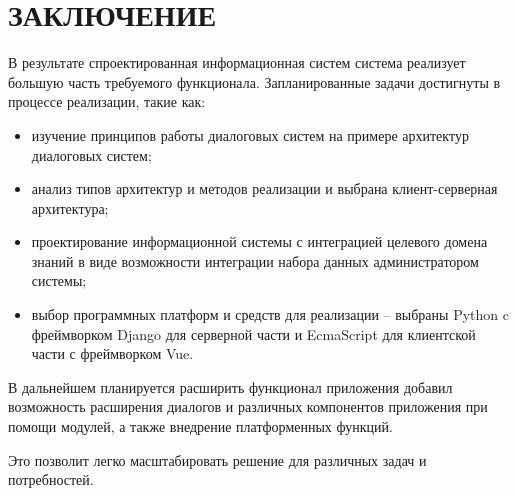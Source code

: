 \chapter*{ЗАКЛЮЧЕНИЕ}

В результате спроектированная  информационная систем система реализует большую часть требуемого функционала. Запланированные задачи достигнуты в процессе реализации, такие как: 

\begin{itemize}
\item изучение принципов работы диалоговых систем на примере архитектур диалоговых систем;
\item анализ типов архитектур и методов реализации и выбрана клиент-серверная архитектура;
\item проектирование информационной системы с интеграцией целевого домена знаний в виде возможности интеграции набора данных администратором системы;  
\item выбор программных платформ и средств для реализации -- выбраны Python c фреймворком Django для серверной части и EcmaScript для клиентской части с фреймворком Vue.
\end{itemize}

В дальнейшем планируется расширить функционал приложения добавил возможность расширения диалогов и различных компонентов приложения при помощи модулей, а также внедрение платформенных функций. 

Это позволит легко масштабировать решение для различных задач и потребностей. 


